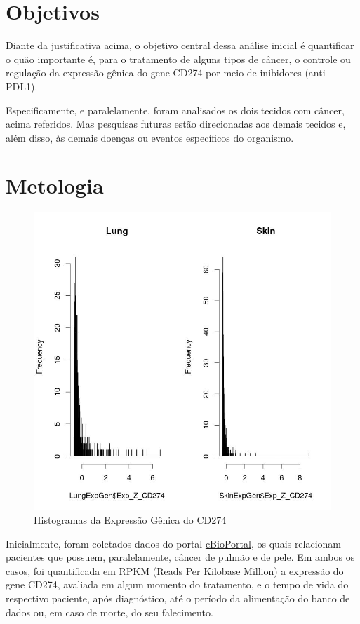\documentclass[a4paper,12pt]{article}
\begin{document}
\section{Objetivos} \label{sec:firstpage}

Diante da justificativa acima, o objetivo central dessa análise inicial é quantificar o quão importante é, para o tratamento de alguns tipos de câncer, o controle ou regulação da expressão gênica do gene CD274
por meio de inibidores (anti-PDL1).

Especificamente, e paralelamente, foram analisados os dois tecidos
com câncer, acima referidos. Mas pesquisas futuras estão direcionadas aos demais tecidos e, além disso,
às demais doenças ou eventos específicos do organismo.

\section{Metologia} \label{sec:firstpage}

\begin{figure}[h!]
\centering
\includegraphics[width=0.7 \textwidth]{plot_histogramas.jpeg}
\caption{Histogramas da Expressão Gênica do CD274}
\label{fig:Hist1}
\end{figure}

Inicialmente, foram coletados dados do portal \href{https://www.cbioportal.org/}{cBioPortal}, os quais
relacionam pacientes que possuem, paralelamente, câncer de pulmão e de pele. Em ambos os casos, foi
quantificada em RPKM (Reads Per Kilobase Million) a expressão do gene CD274, avaliada em algum momento do tratamento, e o tempo de vida do respectivo paciente, após diagnóstico, até o período da alimentação do banco 
de dados ou, em caso de morte, do seu falecimento.
\end{document}
